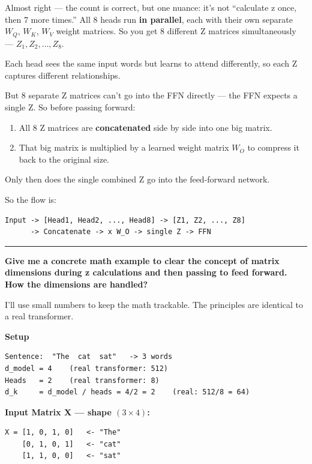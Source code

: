 \medskip

Almost right --- the count is correct, but one nuance: it's not ``calculate z once, then 7 more times.'' All 8 heads run \textbf{in parallel}, each with their own separate $W_Q$, $W_K$, $W_V$ weight matrices. So you get 8 different Z matrices simultaneously --- $Z_1, Z_2, \ldots, Z_8$.

Each head sees the same input words but learns to attend differently, so each Z captures different relationships.

But 8 separate Z matrices can't go into the FFN directly --- the FFN expects a single Z. So before passing forward:

\begin{enumerate}
\item All 8 Z matrices are \textbf{concatenated} side by side into one big matrix.
\item That big matrix is multiplied by a learned weight matrix $W_O$ to compress it back to the original size.
\end{enumerate}

Only then does the single combined Z go into the feed-forward network.

So the flow is:

\begin{verbatim}
Input -> [Head1, Head2, ..., Head8] -> [Z1, Z2, ..., Z8]
      -> Concatenate -> x W_O -> single Z -> FFN
\end{verbatim}

\bigskip
\hrule
\bigskip

\textbf{Give me a concrete math example to clear the concept of matrix dimensions during z calculations and then passing to feed forward. How the dimensions are handled?}

\medskip

I'll use small numbers to keep the math trackable. The principles are identical to a real transformer.

\medskip
\textbf{Setup}

\begin{verbatim}
Sentence:  "The  cat  sat"   -> 3 words
d_model = 4    (real transformer: 512)
Heads   = 2    (real transformer: 8)
d_k     = d_model / heads = 4/2 = 2    (real: 512/8 = 64)
\end{verbatim}

\textbf{Input Matrix X --- shape $(3 \times 4)$:}

\begin{verbatim}
X = [1, 0, 1, 0]   <- "The"
    [0, 1, 0, 1]   <- "cat"
    [1, 1, 0, 0]   <- "sat"
\end{verbatim}

